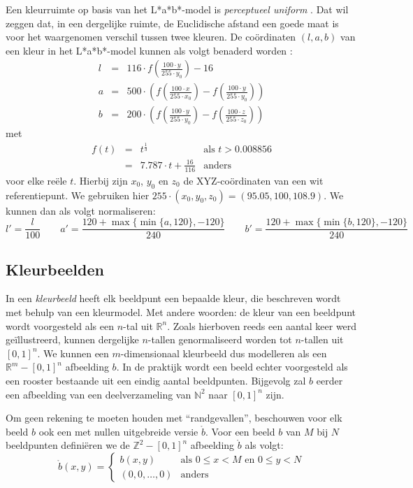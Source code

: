 Een kleurruimte op basis van het L*a*b*-model is \emph{perceptueel uniform} 
\cite{sharma:digital_color_imaging}. Dat wil zeggen dat, in een dergelijke 
ruimte, de Euclidische afstand een goede maat is voor het waargenomen verschil 
tussen twee kleuren. De co\"ordinaten $(l,a,b)$ van een kleur in het 
L*a*b*-model kunnen als volgt benaderd worden 
\cite{debaets:similariteitsmaten_voor_kleurbeelden, philips:beeldverwerking}: $$
\begin{array}{rcl}
l & = & 116 \cdot f(\frac{100 \cdot y}{255 \cdot y_0}) - 16 \\[5pt] a & = & 500 \cdot 
\left(f(\frac{100 \cdot x}{255 \cdot x_0}) - f(\frac{100 \cdot y}{255 \cdot y_0})\right) \\[5pt] b & = & 200 \cdot 
\left(f(\frac{100 \cdot y}{255 \cdot y_0}) - f(\frac{100 \cdot z}{255 \cdot z_0})\right)
\end{array}
$$ met $$
\begin{array}{rcll}
f(t) & = & t^\frac{1}{3} & \textrm{als } t > 0.008856 \\ & = & 7.787 \cdot t + 
\frac{16}{116} & \textrm{anders}
\end{array}
$$ voor elke re\"ele $t$. Hierbij zijn $x_0$, $y_0$ en $z_0$ de
XYZ-co\"ordinaten van een wit referentiepunt. We gebruiken hier 
$255 \cdot (x_0,y_0,z_0)=(95.05,100,108.9)$.
We kunnen dan als volgt normaliseren: $$ l' = \frac{l}{100} \qquad a' = \frac{120 + 
\max\{\min\{a,120\},-120\}}{240} \qquad b' = \frac{120 + \max\{\min\{b,120\},-120\}}{240} $$


\subsection{Kleurbeelden}

In een \emph{kleurbeeld} heeft elk beeldpunt een bepaalde kleur, die beschreven wordt met
behulp van een kleurmodel. Met andere woorden: de kleur van een beeldpunt wordt voorgesteld 
als een $n$-tal uit
$\mathbb{R}^n$. Zoals hierboven reeds een aantal keer werd ge\"illustreerd, kunnen dergelijke 
$n$-tallen genormaliseerd worden tot $n$-tallen uit $[0,1]^n$. We kunnen een $m$-dimensionaal 
kleurbeeld dus modelleren als een $\mathbb{R}^m - [0,1]^n$ afbeelding $b$. 
In de praktijk wordt een beeld echter voorgesteld als een rooster bestaande uit een
eindig aantal beeldpunten. Bijgevolg zal $b$ eerder een afbeelding van een deelverzameling van 
$\mathbb{N}^2$ naar $[0,1]^n$ zijn. 

Om geen rekening te moeten houden met ``randgevallen'', beschouwen voor elk beeld $b$ ook een
met nullen uitgebreide versie $\mathring{b}$. Voor een beeld $b$ van $M$ bij $N$ beeldpunten
defini\"eren we de $\mathbb{Z}^2 - [0,1]^n$ afbeelding $\mathring{b}$ als volgt:
$$
\mathring{b}(x,y) = \left\{ \begin{array}{ll}
b(x,y) & \textrm{als } 0 \le x < M \textrm{ en } 0 \le y < N \\
(0,0,\ldots,0) & \textrm{anders}
\end{array} \right.
$$


